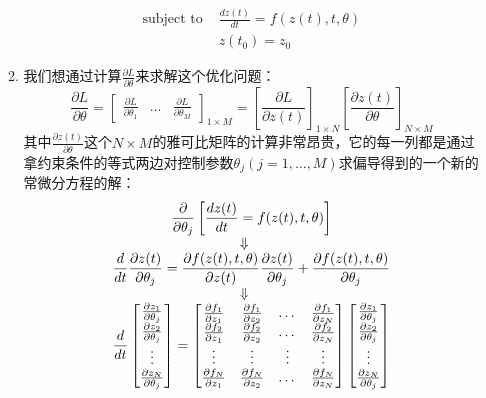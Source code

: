 \documentclass[11pt]{article}
\begin{document}
\begin{enumerate}
\begin{enumerate}
\[\begin{split}
\text{subject to }&\frac{dz(t)}{dt}=f(z(t),t,\theta)\\
&z(t_0)=z_0
\end{split}
\]
\item 我们想通过计算$\frac{\partial L}{\partial\theta}$来求解这个优化问题：\[
\frac{\partial L}{\partial\theta}=\begin{bmatrix}\frac{\partial L}{\partial\theta_1}&\dots&\frac{\partial L}{\partial\theta_M}\end{bmatrix}_{1\times M}=\left[\frac{\partial L}{\partial z(t)}\right]_{1\times N}\left[\frac{\partial z(t)}{\partial\theta}\right]_{N\times M}
\]其中$\frac{\partial z(t)}{\partial\theta}$这个$N\times M$的雅可比矩阵的计算非常昂贵，它的每一列都是通过拿约束条件的等式两边对控制参数$\theta_j(j=1,\dots,M)$求偏导得到的一个新的常微分方程的解：
\begin{gather*}
\frac{\partial}{\partial\theta_j}\left[\frac{dz(t)}{dt}=f(z(t),t,\theta)\right]\\
\ArrowBetweenLines[\Downarrow]
\frac{d}{dt}\frac{\partial z(t)}{\partial\theta_j}=\frac{\partial f(z(t),t,\theta)}{\partial z(t)}\frac{\partial z(t)}{\partial\theta_j}+\frac{\partial f(z(t),t,\theta)}{\partial\theta_j}\\
\ArrowBetweenLines[\Downarrow]
\frac{d}{dt}
\begin{bmatrix}
\frac{\partial z_1}{\partial\theta_j}\\
\frac{\partial z_2}{\partial\theta_j}\\
\vdots\\
\frac{\partial z_N}{\partial\theta_j}
\end{bmatrix}
=
\begin{bmatrix}
\frac{\partial f_1}{\partial z_1}&\frac{\partial f_1}{\partial z_2}&\dots&\frac{\partial f_1}{\partial z_N}\\
\frac{\partial f_2}{\partial z_1}&\frac{\partial f_2}{\partial z_2}&\dots&\frac{\partial f_2}{\partial z_N}\\
\vdots&\vdots&\vdots&\vdots\\
\frac{\partial f_N}{\partial z_1}&\frac{\partial f_N}{\partial z_2}&\dots&\frac{\partial f_N}{\partial z_N}
\end{bmatrix}
\begin{bmatrix}
\frac{\partial z_1}{\partial\theta_j}\\
\frac{\partial z_2}{\partial\theta_j}\\
\vdots\\
\frac{\partial z_N}{\partial\theta_j}
\end{bmatrix}

\end{gather*}
\end{enumerate}
\end{enumerate}
\end{document}

